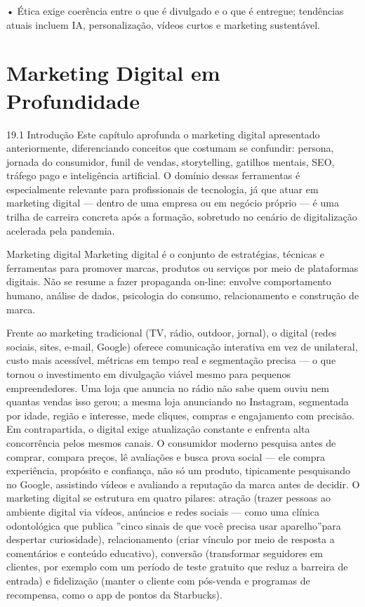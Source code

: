 • Ética exige coerência entre o que é divulgado e o que é entregue; tendências atuais incluem IA, personalização, vídeos curtos e marketing sustentável.

\chapter{Marketing Digital em Profundidade}

19.1 Introdução Este capítulo aprofunda o marketing digital apresentado anteriormente, diferenciando conceitos que costumam se confundir: persona, jornada do consumidor, funil de vendas, storytelling, gatilhos mentais, SEO, tráfego pago e inteligência artificial. O domínio dessas ferramentas é especialmente relevante para profissionais de tecnologia, já que atuar em marketing digital — dentro de uma empresa ou em negócio próprio — é uma trilha de carreira concreta após a formação, sobretudo no cenário de digitalização acelerada pela pandemia.

Marketing digital Marketing digital é o conjunto de estratégias, técnicas e ferramentas para promover marcas, produtos ou serviços por meio de plataformas digitais. Não se resume a fazer propaganda on-line: envolve comportamento humano, análise de dados, psicologia do consumo, relacionamento e construção de marca.

Frente ao marketing tradicional (TV, rádio, outdoor, jornal), o digital (redes sociais, sites, e-mail, Google) oferece comunicação interativa em vez de unilateral, custo mais acessível, métricas em tempo real e segmentação precisa — o que tornou o investimento em divulgação viável mesmo para pequenos empreendedores. Uma loja que anuncia no rádio não sabe quem ouviu nem quantas vendas isso gerou; a mesma loja anunciando no Instagram, segmentada por idade, região e interesse, mede cliques, compras e engajamento com precisão. Em contrapartida, o digital exige atualização constante e enfrenta alta concorrência pelos mesmos canais. O consumidor moderno pesquisa antes de comprar, compara preços, lê avaliações e busca prova social — ele compra experiência, propósito e confiança, não só um produto, tipicamente pesquisando no Google, assistindo vídeos e avaliando a reputação da marca antes de decidir. O marketing digital se estrutura em quatro pilares: atração (trazer pessoas ao ambiente digital via vídeos, anúncios e redes sociais — como uma clínica odontológica que publica ”cinco sinais de que você precisa usar aparelho”para despertar curiosidade), relacionamento (criar vínculo por meio de resposta a comentários e conteúdo educativo), conversão (transformar seguidores em clientes, por exemplo com um período de teste gratuito que reduz a barreira de entrada) e fidelização (manter o cliente com pós-venda e programas de recompensa, como o app de pontos da Starbucks).

